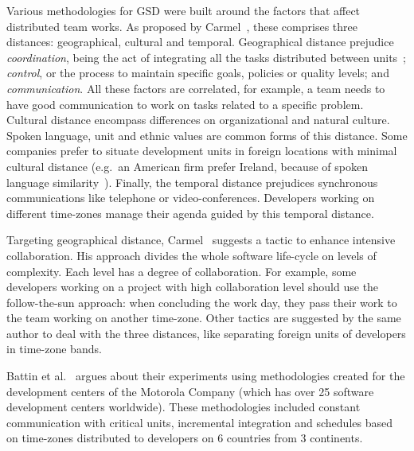 \documentclass[letterpaper]{article}
\begin{document}
Various methodologies for GSD were built around the factors that affect
distributed team works. As proposed by Carmel~\cite{carmel1999}, these comprises
three distances: geographical, cultural and temporal. Geographical distance
prejudice \emph{coordination}, being the act of integrating all the tasks
distributed between units~\cite{carmel2001}; \emph{control}, or the process to
maintain specific goals, policies or quality levels; and
\emph{communication}. All these factors are correlated, for example, a team needs
to have good communication to work on tasks related to a specific problem. Cultural
distance encompass differences on organizational and natural culture. Spoken
language, unit and ethnic values are common forms of this distance. Some
companies prefer to situate development units in foreign locations with minimal
cultural distance (e.g.\ an American firm prefer Ireland, because of spoken
language similarity~\cite{carmel2001}). Finally, the temporal distance
prejudices synchronous communications like telephone or video-conferences.
Developers working on different time-zones manage
their agenda guided by this temporal distance.

Targeting geographical distance, Carmel~\cite{carmel2001} suggests a tactic to
enhance intensive collaboration. His approach divides the whole software
life-cycle on levels of complexity. Each level has a degree of
collaboration. For example, some developers working on a project with high
collaboration level should use the follow-the-sun approach: when concluding the
work day, they pass their work to the team working on another time-zone. Other
tactics are suggested by the same author to deal with the three distances, like
separating foreign units of developers in time-zone bands.

Battin et al.~\cite{battin2001} argues about their experiments using
methodologies created for the development centers of the
Motorola Company (which has over 25 software development centers
worldwide). These methodologies included constant communication with critical
units, incremental integration and schedules based on time-zones distributed to
developers on 6 countries from 3 continents.
\end{document}
